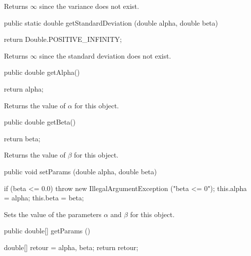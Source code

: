 \begin{tabb}  Returns $\infty$ since the variance does not exist.
\end{tabb}
\begin{htmlonly}
\end{htmlonly}
\begin{code}

   public static double getStandardDeviation (double alpha, double beta)\begin{hide} {
      return Double.POSITIVE_INFINITY;
   }\end{hide}
\end{code}
\begin{tabb} Returns $\infty$ since the standard deviation does not exist.
\end{tabb}
\begin{htmlonly}
   \return{$\infty$}
\end{htmlonly}
\begin{code}

   public double getAlpha()\begin{hide} {
      return alpha;
   }\end{hide}
\end{code}
  \begin{tabb}
  Returns the value of $\alpha$ for this object.
 \end{tabb}
\begin{code}

   public double getBeta()\begin{hide} {
      return beta;
   }
\end{hide}
\end{code}
  \begin{tabb}
  Returns the value of $\beta$ for this object.
 \end{tabb}
\begin{code}

   public void setParams (double alpha, double beta)\begin{hide} {
      if (beta <= 0.0)
         throw new IllegalArgumentException ("beta <= 0");
      this.alpha = alpha;
      this.beta = beta;
   }\end{hide}
\end{code}
  \begin{tabb}
  Sets the value of the parameters $\alpha$ and $\beta$ for this object.
 \end{tabb}
\begin{code}

   public double[] getParams ()\begin{hide} {
      double[] retour = {alpha, beta};
      return retour;
   }\end{hide}
\end{code}
